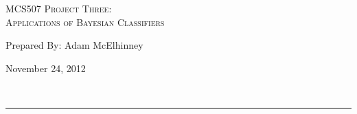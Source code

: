 \begin{center}
\textsc{\Large MCS507 Project Three:\\}
\textsc{Applications of Bayesian Classifiers}
\end{center}
\begin{minipage}{0.6\textwidth}
\begin{flushleft}
	Prepared By: Adam McElhinney
\end{flushleft}
\end{minipage}
\begin{minipage}{0.39\textwidth}
\begin{flushright}
	November 24, 2012
\end{flushright}
\end{minipage}\\[0.01in]
\hrule